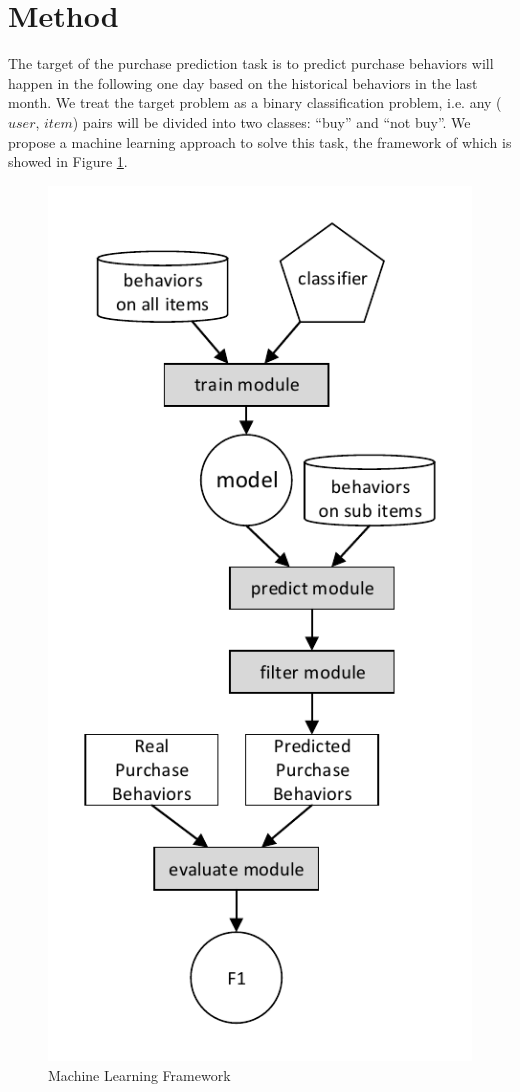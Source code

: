 \documentclass{llncs}
\begin{document}
\section{Method}
The target of the purchase prediction task is to predict purchase behaviors will happen
in the following one day based on the historical behaviors in the last month.
We treat the target problem as a binary classification problem,
i.e. any ($user$, $item$) pairs will be divided into two classes:
``buy'' and ``not buy''.
We propose a machine learning approach to solve this task,
the framework of which is showed in Figure \ref{fig:framework}.

\begin{figure}[htbp]
	\centering
	\includegraphics[scale=1.0]{images/system.pdf}
	\caption{Machine Learning Framework}
	\label{fig:framework}
\end{figure}
\end{document}
